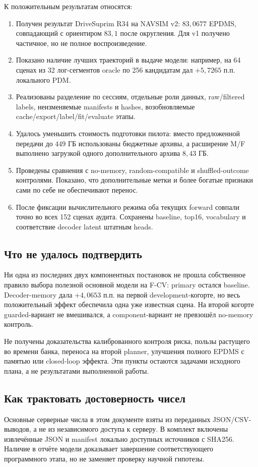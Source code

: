 \documentclass[11pt,a4paper]{article}
\newcommand{\code}[1]{\texttt{\detokenize{#1}}}
\begin{document}
К положительным результатам относятся:
\begin{enumerate}
\item Получен результат DriveSuprim R34 на NAVSIM v2: $83{,}0677$ EPDMS, совпадающий с ориентиром $83{,}1$ после округления. Для v1 получено частичное, но не полное воспроизведение.
\item Показано наличие лучших траекторий в выдаче модели: например, на 64 сценах из 32 лог-сегментов oracle по 256 кандидатам дал $+5{,}7265$ п.п. локального PDM.
\item Реализованы разделение по сессиям, отдельные роли данных, raw/filtered labels, неизменяемые manifests и hashes, возобновляемые cache/export/label/fit/evaluate этапы.
\item Удалось уменьшить стоимость подготовки пилота: вместо предложенной передачи до $449$ ГБ использованы бюджетные архивы, а расширение M/F выполнено загрузкой одного дополнительного архива $8{,}43$ ГБ.
\item Проведены сравнения с no-memory, random-compatible и shuffled-outcome контролями. Показано, что дополнительные метки и более богатые признаки сами по себе не обеспечивают перенос.
\item После фиксации вычислительного режима оба текущих forward совпали точно во всех 152 сценах аудита. Сохранены baseline, top16, vocabulary и соответствие decoder latent штатным heads.
\end{enumerate}

\subsection{Что не удалось подтвердить}
Ни одна из последних двух компонентных постановок не прошла собственное правило выбора полезной основной модели на F-CV: primary остался baseline. Decoder-memory дала $+4{,}0653$ п.п. на первой development-когорте, но весь положительный эффект обеспечила одна уже известная сцена. На второй когорте guarded-вариант не вмешивался, а component-вариант не превзошёл no-memory контроль.

Не получены доказательства калиброванного контроля риска, пользы растущего во времени банка, переноса на второй planner, улучшения полного EPDMS с памятью или closed-loop эффекта. Эти пункты остаются задачами исходного плана, а не результатами выполненной работы.

\subsection{Как трактовать достоверность чисел}
Основные серверные числа в этом документе взяты из переданных JSON/CSV-выводов, а не из независимого доступа к серверу. В комплект включены извлечённые JSON и manifest локально доступных источников с SHA256. Наличие \code{status=complete} в отчёте модели доказывает завершение соответствующего программного этапа, но не заменяет проверку научной гипотезы.
\end{document}
